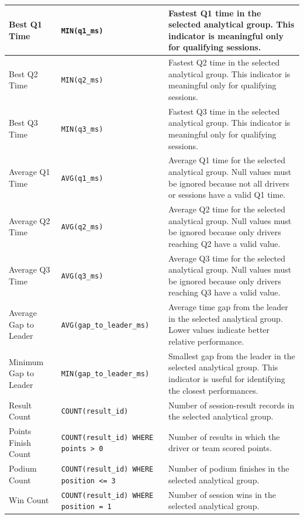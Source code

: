 \documentclass[a4paper,11pt]{article}
\begin{document}
\begin{longtable}{|p{4.5cm}|p{5.2cm}|p{6cm}|}
		Best Q1 Time
		& \texttt{MIN(q1\_ms)}
		& Fastest Q1 time in the selected analytical group. This indicator is meaningful only
		for qualifying sessions. \\
		\hline
		
		Best Q2 Time
		& \texttt{MIN(q2\_ms)}
		& Fastest Q2 time in the selected analytical group. This indicator is meaningful only
		for qualifying sessions. \\
		\hline
		
		Best Q3 Time
		& \texttt{MIN(q3\_ms)}
		& Fastest Q3 time in the selected analytical group. This indicator is meaningful only
		for qualifying sessions. \\
		\hline
		
		Average Q1 Time
		& \texttt{AVG(q1\_ms)}
		& Average Q1 time for the selected analytical group. Null values must be ignored
		because not all drivers or sessions have a valid Q1 time. \\
		\hline
		
		Average Q2 Time
		& \texttt{AVG(q2\_ms)}
		& Average Q2 time for the selected analytical group. Null values must be ignored
		because only drivers reaching Q2 have a valid value. \\
		\hline
		
		Average Q3 Time
		& \texttt{AVG(q3\_ms)}
		& Average Q3 time for the selected analytical group. Null values must be ignored
		because only drivers reaching Q3 have a valid value. \\
		\hline
		
		Average Gap to Leader
		& \texttt{AVG(gap\_to\_leader\_ms)}
		& Average time gap from the leader in the selected analytical group. Lower values
		indicate better relative performance. \\
		\hline
		
		Minimum Gap to Leader
		& \texttt{MIN(gap\_to\_leader\_ms)}
		& Smallest gap from the leader in the selected analytical group. This indicator is
		useful for identifying the closest performances. \\
		\hline
		
		Result Count
		& \texttt{COUNT(result\_id)}
		& Number of session-result records in the selected analytical group. \\
		\hline
		
		Points Finish Count
		& \texttt{COUNT(result\_id) WHERE points > 0}
		& Number of results in which the driver or team scored points. \\
		\hline
		
		Podium Count
		& \texttt{COUNT(result\_id) WHERE position <= 3}
		& Number of podium finishes in the selected analytical group. \\
		\hline
		
		Win Count
		& \texttt{COUNT(result\_id) WHERE position = 1}
		& Number of session wins in the selected analytical group. \\
		\hline
		
	\end{longtable}
	
	
\end{document}
